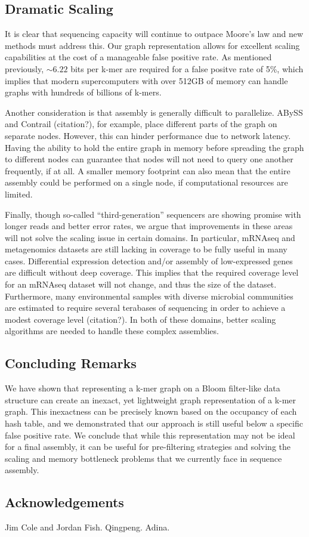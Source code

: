 \documentclass[12pt]{article} \usepackage{simplemargins}
\begin{document}
\subsection{Dramatic Scaling}
It is clear that sequencing capacity will continue to outpace Moore's 
law and new methods must address this. Our graph representation allows 
for excellent scaling capabilities at the cost of a manageable false positive rate. 
As mentioned previously, $\sim 6.22$ bits per k-mer are required for a 
false positve rate of 5\%, which implies that modern supercomputers with 
over 512GB of memory can handle graphs with hundreds of billions of k-mers.

Another consideration is that assembly is generally difficult to parallelize. 
ABySS and Contrail (citation?), for example, place different parts of the 
graph on separate nodes. However, this can hinder performance due to 
network latency. Having the ability to hold the entire graph in memory 
before spreading the graph to different nodes can guarantee that nodes 
will not need to query one another frequently, if at all. A smaller memory 
footprint can also mean that the entire assembly could be performed on 
a single node, if computational resources are limited.

Finally, though so-called ``third-generation'' sequencers are showing promise with 
longer reads and better error rates, we argue that improvements in these 
areas will not solve the scaling issue in certain domains. In particular, 
mRNAseq and metagenomics datasets are still lacking in coverage to be 
fully useful in many cases. Differential expression detection and/or assembly 
of low-expressed genes are difficult without deep coverage. This implies 
that the required coverage level for an mRNAseq dataset will not change, 
and thus the size of the dataset. Furthermore, many environmental samples with 
diverse microbial communities are estimated to require several terabases of sequencing 
in order to achieve a modest coverage level (citation?). In both of these domains, better 
scaling algorithms are needed to handle these complex assemblies. 

\subsection{Concluding Remarks}
We have shown that representing a k-mer graph on a Bloom filter-like data 
structure can create an inexact, yet lightweight graph representation of 
a k-mer graph. This inexactness can be precisely known based on the occupancy 
of each hash table, and we demonstrated that our approach is still useful 
below a specific false positive rate. We conclude that while this representation 
may not be ideal for a final assembly, it can be useful for pre-filtering 
strategies and solving the scaling and memory bottleneck problems that we 
currently face in sequence assembly.

\subsection{Acknowledgements}

Jim Cole and Jordan Fish.  Qingpeng.  Adina.



\end{document}
